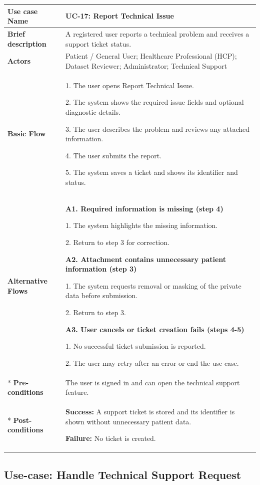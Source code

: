 \begin{longtable}{|p{}|p{}|}
\hline
\textbf{Use case Name} & UC-17: Report Technical Issue \\ \hline
\textbf{Brief description} & A registered user reports a technical problem and receives a support ticket status. \\ \hline
\textbf{Actors} & Patient / General User; Healthcare Professional (HCP); Dataset Reviewer; Administrator; Technical Support \\ \hline
\textbf{Basic Flow} &
1. The user opens Report Technical Issue.\par
2. The system shows the required issue fields and optional diagnostic details.\par
3. The user describes the problem and reviews any attached information.\par
4. The user submits the report.\par
5. The system saves a ticket and shows its identifier and status.
\\ \hline
\textbf{Alternative Flows} &
\textbf{A1. Required information is missing (step 4)}\par
1. The system highlights the missing information.\par
2. Return to step 3 for correction.
\par
\textbf{A2. Attachment contains unnecessary patient information (step 3)}\par
1. The system requests removal or masking of the private data before submission.\par
2. Return to step 3.
\par
\textbf{A3. User cancels or ticket creation fails (steps 4-5)}\par
1. No successful ticket submission is reported.\par
2. The user may retry after an error or end the use case.
\\* \hline
\textbf{Pre-conditions} & The user is signed in and can open the technical support feature. \\* \hline
\textbf{Post-conditions} & \textbf{Success:} A support ticket is stored and its identifier is shown without unnecessary patient data.\par
\textbf{Failure:} No ticket is created. \\ \hline
\end{longtable}

\clearpage
\subsection{Use-case: Handle Technical Support Request}
\label{uc:uc-18}

